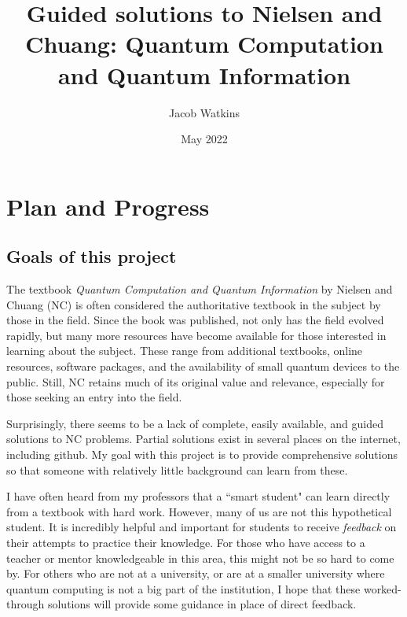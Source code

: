 \documentclass{book}
\title{Guided solutions to Nielsen and Chuang: Quantum Computation and Quantum Information}
\author{Jacob Watkins}
\date{May 2022}
\begin{document}
\maketitle

\setcounter{chapter}{-1}
\chapter{Plan and Progress}
\section{Goals of this project}
The textbook \emph{Quantum Computation and Quantum Information} by Nielsen and Chuang (NC) is often considered the authoritative textbook in the subject by those in the field. Since the book was published, not only has the field evolved rapidly, but many more resources have become available for those interested in learning about the subject. These range from additional textbooks, online resources, software packages, and the availability of small quantum devices to the public. Still, NC retains much of its original value and relevance, especially for those seeking an entry into the field.

Surprisingly, there seems to be a lack of complete, easily available, and guided solutions to NC problems. Partial solutions exist in several places on the internet, including github. My goal with this project is to provide comprehensive solutions so that someone with relatively little background can learn from these.

I have often heard from my professors that a ``smart student" can learn directly from a textbook with hard work. However, many of us are not this hypothetical student. It is incredibly helpful and important for students to receive \emph{feedback} on their attempts to practice their knowledge. For those who have access to a teacher or mentor knowledgeable in this area, this might not be so hard to come by. For others who are not at a university, or are at a smaller university where quantum computing is not a big part of the institution, I hope that these worked-through solutions will provide some guidance in place of direct feedback. 
\end{document}
